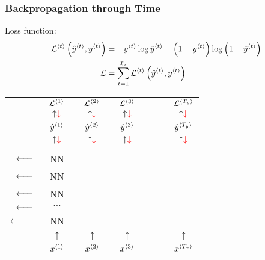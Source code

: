 \subsubsection{Backpropagation through Time}
Loss function:
\begin{align*}
  \mathcal{L}^{\left\langle t\right\rangle}\left(\hat{y}^{\left\langle t\right\rangle}, y^{\left\langle t\right\rangle}\right)&=-y^{\left\langle t\right\rangle}\log\hat{y}^{\left\langle t\right\rangle}-\left(1-y^{\left\langle t\right\rangle}\right)\log\left(1-\hat{y}^{\left\langle t\right\rangle}\right)\\
  \mathcal{L}&=\displaystyle\sum_{t=1}^{T_x}\mathcal{L}^{\left\langle t\right\rangle}\left(\hat{y}^{\left\langle t\right\rangle}, y^{\left\langle t\right\rangle}\right)
\end{align*}
\begin{center}
  \begin{tabular}{cccccccccc}
    & $\mathcal{L}^{\left\langle 1\right\rangle}$ & & $\mathcal{L}^{\left\langle 2\right\rangle}$ & & $\mathcal{L}^{\left\langle 3\right\rangle}$ & & & & $\mathcal{L}^{\left\langle T_y\right\rangle}$\\
    & $\uparrow\color{red}\downarrow$ & & $\uparrow\color{red}\downarrow$ & & $\uparrow\color{red}\downarrow$ & & & & $\uparrow\color{red}\downarrow$\\ 
    & $\hat{y}^{\left\langle 1\right\rangle}$ & & $\hat{y}^{\left\langle 2\right\rangle}$ & & $\hat{y}^{\left\langle 3\right\rangle}$ & & & & $\hat{y}^{\left\langle T_y\right\rangle}$\\
    & $\uparrow\color{red}\downarrow$ & & $\uparrow\color{red}\downarrow$ & & $\uparrow\color{red}\downarrow$ & & & & $\uparrow\color{red}\downarrow$\\ 
    \makecell{$\xrightarrow{\angless{a}{0}}$\\\color{red}$\xleftarrow{\hphantom{\angless{a}{0}}}$}& NN & \makecell{$\xrightarrow{\angless{a}{1}}$\\\color{red}$\xleftarrow{\hphantom{\angless{a}{0}}}$} & NN & \makecell{$\xrightarrow{\angless{a}{2}}$\\\color{red}$\xleftarrow{\hphantom{\angless{a}{2}}}$} & NN & \makecell{$\xrightarrow{\angless{a}{3}}$\\\color{red}$\xleftarrow{\hphantom{\angless{a}{0}}}$} & $\cdots$ & \makecell{$\xrightarrow{\angless{a}{T_x-1}}$\\\color{red}$\xleftarrow{\hphantom{\angless{a}{T_x-1}}}$} & NN \\ 
    & $\uparrow$ & & $\uparrow$ & & $\uparrow$ & & & & $\uparrow$\\ 
    & $x^{\left\langle 1\right\rangle}$ & & $x^{\left\langle 2\right\rangle}$ & & $x^{\left\langle 3\right\rangle}$ & & & & $x^{\left\langle T_x\right\rangle}$\\
  \end{tabular}
\end{center}
